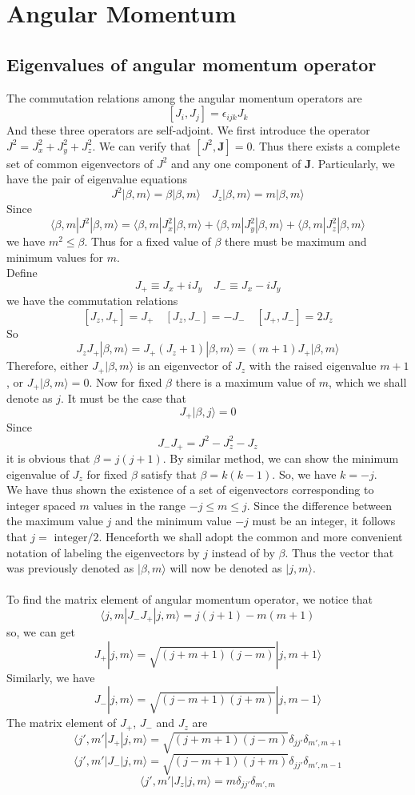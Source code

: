 \chapter{Angular Momentum}
\section{Eigenvalues of angular momentum operator}
The commutation relations among the angular momentum operators are
\[[J_i,J_j] = \epsilon_{ijk} J_k\]
And these three operators are self-adjoint. We first introduce the operator $J^2 = J_x^2 + J_y^2 + J_z^2$. We can verify that $[J^2,\bm{J}] = 0$. Thus there exists a complete set of common eigenvectors of $J^2$ and any one component of $\bm{J}$. Particularly, we have the pair of eigenvalue equations
\[J^2 | \beta,m\rangle = \beta | \beta,m\rangle \quad J_z | \beta,m\rangle = m | \beta,m\rangle\]
Since
\[\langle \beta,m | J^2 | \beta,m \rangle = \langle \beta,m | J_x^2 | \beta,m \rangle + \langle \beta,m | J_y^2 | \beta,m \rangle + \langle \beta,m | J_z^2 | \beta,m \rangle\]
we have $m^2 \leq \beta$. Thus for a fixed value of $\beta$ there must be maximum and minimum values for $m$.\\
Define
\[J_+ \equiv J_x + iJ_y \quad J_- \equiv J_x - iJ_y\]
we have the commutation relations
\[[J_z,J_+] = J_+ \quad [J_z,J_-] = -J_- \quad [J_+,J_-] = 2J_z\]
So
\[J_z J_+ | \beta,m\rangle = J_+(J_z + 1)| \beta,m\rangle = (m+1)J_+| \beta,m\rangle\]
Therefore, either $J_+ | \beta,m\rangle$ is an eigenvector of $J_z$ with the raised eigenvalue $m+1$, or $J_+ | \beta,m\rangle = 0$. Now for fixed $\beta$ there is a maximum value of $m$, which we shall denote as $j$. It must be the case that
\[J_+ |\beta,j\rangle = 0\]
Since
\[J_- J_+ = J^2 - J_z^2 - J_z\]
it is obvious that $\beta = j(j+1)$. By similar method, we can show the minimum eigenvalue of $J_z$ for fixed $\beta$ satisfy that $\beta = k(k-1)$. So, we have $k = -j$. \\
We have thus shown the existence of a set of eigenvectors corresponding to integer spaced $m$ values in the range $-j \leq m \leq j$. Since the difference between the maximum value $j$ and the minimum value $-j$ must be an integer, it follows that $j = \mbox{ integer} / 2$. Henceforth we shall adopt the common and more convenient notation of labeling the eigenvectors by $j$ instead of by $\beta$. Thus the vector that was previously denoted as $|\beta,m\rangle$ will now be denoted as $|j,m\rangle$. \\ \\
To find the matrix element of angular momentum operator, we notice that
\[\langle j,m| J_-J_+|j,m\rangle = j(j+1)-m(m+1)\]
so, we can get
\[J_+ |j,m\rangle = \sqrt{(j+m+1)(j-m)} |j,m+1\rangle\]
Similarly, we have
\[J_- |j,m\rangle = \sqrt{(j-m+1)(j+m)} |j,m-1\rangle\]
The matrix element of $J_+$, $J_-$ and $J_z$ are
\[\langle j',m'| J_+ | j,m\rangle = \sqrt{(j+m+1)(j-m)} \delta_{jj'}\delta_{m',m+1}\]
\[\langle j',m'| J_- | j,m\rangle = \sqrt{(j-m+1)(j+m)} \delta_{jj'}\delta_{m',m-1}\]
\[\langle j',m'| J_z | j,m\rangle = m \delta_{jj'}\delta_{m',m}\]

